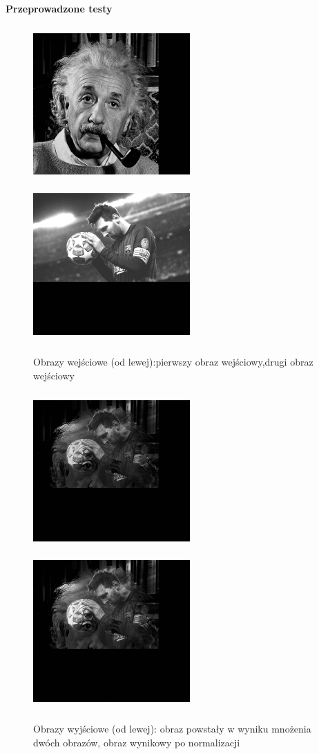\documentclass[magisterska,openany]{pracadypl}
\begin{document}
\newpage
\vspace{0.25cm}\textbf{\Large Przeprowadzone testy}
\vspace{0.5cm}
\begin{figure}[h]
\centering
\includegraphics[width=6cm, height=6cm]{2_2/ResolG1.jpg}
\includegraphics[width=6cm, height=6cm]{2_2/ResolG2.jpg}
\caption{Obrazy wejściowe (od lewej):pierwszy obraz wejściowy,drugi obraz wejściowy}
\end{figure}
\begin{figure}[h]
\centering
\includegraphics[width=6cm, height=6cm]{3_4/multi_twoG1.jpg}
\includegraphics[width=6cm, height=6cm]{3_4/nmulti_twoG1.jpg}
\caption{Obrazy wyjściowe (od lewej): obraz powstały w wyniku mnożenia dwóch obrazów, obraz wynikowy po normalizacji}
\end{figure}
\end{document}
